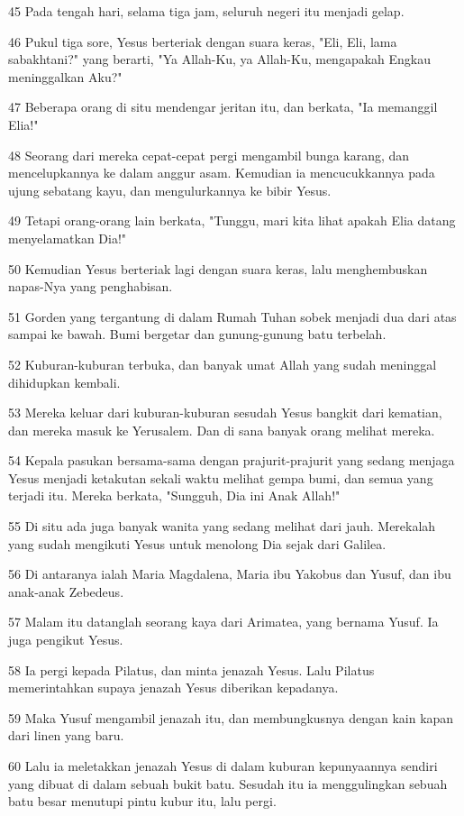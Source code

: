 \par 45 Pada tengah hari, selama tiga jam, seluruh negeri itu menjadi gelap.
\par 46 Pukul tiga sore, Yesus berteriak dengan suara keras, "Eli, Eli, lama sabakhtani?" yang berarti, "Ya Allah-Ku, ya Allah-Ku, mengapakah Engkau meninggalkan Aku?"
\par 47 Beberapa orang di situ mendengar jeritan itu, dan berkata, "Ia memanggil Elia!"
\par 48 Seorang dari mereka cepat-cepat pergi mengambil bunga karang, dan mencelupkannya ke dalam anggur asam. Kemudian ia mencucukkannya pada ujung sebatang kayu, dan mengulurkannya ke bibir Yesus.
\par 49 Tetapi orang-orang lain berkata, "Tunggu, mari kita lihat apakah Elia datang menyelamatkan Dia!"
\par 50 Kemudian Yesus berteriak lagi dengan suara keras, lalu menghembuskan napas-Nya yang penghabisan.
\par 51 Gorden yang tergantung di dalam Rumah Tuhan sobek menjadi dua dari atas sampai ke bawah. Bumi bergetar dan gunung-gunung batu terbelah.
\par 52 Kuburan-kuburan terbuka, dan banyak umat Allah yang sudah meninggal dihidupkan kembali.
\par 53 Mereka keluar dari kuburan-kuburan sesudah Yesus bangkit dari kematian, dan mereka masuk ke Yerusalem. Dan di sana banyak orang melihat mereka.
\par 54 Kepala pasukan bersama-sama dengan prajurit-prajurit yang sedang menjaga Yesus menjadi ketakutan sekali waktu melihat gempa bumi, dan semua yang terjadi itu. Mereka berkata, "Sungguh, Dia ini Anak Allah!"
\par 55 Di situ ada juga banyak wanita yang sedang melihat dari jauh. Merekalah yang sudah mengikuti Yesus untuk menolong Dia sejak dari Galilea.
\par 56 Di antaranya ialah Maria Magdalena, Maria ibu Yakobus dan Yusuf, dan ibu anak-anak Zebedeus.
\par 57 Malam itu datanglah seorang kaya dari Arimatea, yang bernama Yusuf. Ia juga pengikut Yesus.
\par 58 Ia pergi kepada Pilatus, dan minta jenazah Yesus. Lalu Pilatus memerintahkan supaya jenazah Yesus diberikan kepadanya.
\par 59 Maka Yusuf mengambil jenazah itu, dan membungkusnya dengan kain kapan dari linen yang baru.
\par 60 Lalu ia meletakkan jenazah Yesus di dalam kuburan kepunyaannya sendiri yang dibuat di dalam sebuah bukit batu. Sesudah itu ia menggulingkan sebuah batu besar menutupi pintu kubur itu, lalu pergi.
